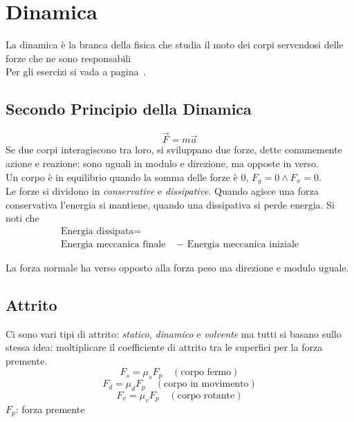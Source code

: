 
\section{Dinamica}\label{sec:dinamica}
La dinamica è la branca della fisica che studia il moto dei corpi servendosi delle forze che ne
sono responsabili\\
Per gli esercizi si vada a pagina~\pageref{ex:dinamica}.
\subsection{Secondo Principio della Dinamica}
\begin{equation*}
\vec{F} = m\vec{a}
\end{equation*}
Se due corpi interagiscono tra loro, si sviluppano due forze, dette comunemente azione e reazione: 
sono uguali in modulo e direzione, ma opposte in verso.\\
Un corpo è in equilibrio quando la somma delle forze è 0, $F_y = 0\land F_x = 0$.\\
Le forze si dividono in \emph{conservative} e \emph{dissipative}. Quando agisce una forza conservativa
l'energia si mantiene, quando una dissipativa si perde energia. Si noti che
\begin{align*}
  \text{Energia dissipata} =&\\
  \text{Energia meccanica finale } &- \text{ Energia meccanica iniziale}
\end{align*}

\begin{center}
\end{center}
La forza normale ha verso opposto alla forza peso ma direzione e modulo uguale.

\subsection{Attrito}
Ci sono vari tipi di attrito: \emph{statico}, \emph{dinamico} e \emph{volvente} ma tutti si basano
sullo stessa idea: moltiplicare il coefficiente di attrito tra le superfici per la forza premente.
\begin{equation*}
  F_s = \mu_sF_p\quad (\text{corpo fermo})
\end{equation*}
\begin{equation*}
  F_d = \mu_dF_p\quad (\text{corpo in movimento})
\end{equation*}
\begin{equation*}
  F_v = \mu_vF_p\quad (\text{corpo rotante})
\end{equation*}
$F_p$: forza premente

